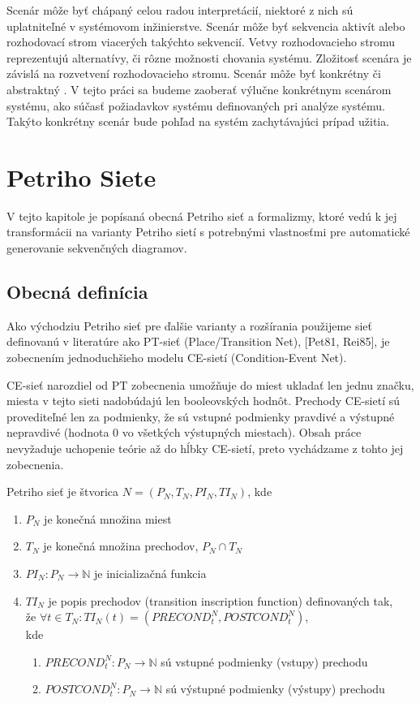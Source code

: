 Scenár môže byť chápaný celou radou interpretácií, niektoré z nich sú uplatniteľné v systémovom inžinierstve. Scenár môže byť sekvencia aktivít alebo rozhodovací strom viacerých takýchto sekvencií. Vetvy rozhodovacieho stromu reprezentujú alternatívy, či rôzne možnosti chovania systému. Zložitosť scenára je závislá na rozvetvení rozhodovacieho stromu. Scenár môže byť konkrétny či abstraktný \cite{scenarios}. V tejto práci sa budeme zaoberať výlučne konkrétnym scenárom systému, ako súčasť požiadavkov systému definovaných pri analýze systému. Takýto konkrétny scenár bude pohľad na systém zachytávajúci prípad užitia.


\chapter{Petriho Siete}
V tejto kapitole je popísaná obecná Petriho sieť a formalizmy, ktoré vedú k jej transformácii na varianty Petriho sietí s potrebnými vlastnosťmi pre automatické generovanie sekvenčných diagramov.

\section{Obecná definícia}
Ako východziu Petriho sieť pre ďalšie varianty a rozšírania použijeme sieť definovanú v literatúre ako PT-sieť (Place/Transition Net), [Pet81, Rei85], je zobecnením jednoduchšieho modelu CE-sietí (Condition-Event Net).

\begin{note}
	CE-sieť narozdiel od PT zobecnenia umožňuje do miest ukladať len jednu značku, miesta v tejto sieti nadobúdajú len booleovských hodnôt. Prechody CE-sietí sú provediteľné len za podmienky, že sú vstupné podmienky pravdivé a výstupné nepravdivé (hodnota 0 vo všetkých výstupných miestach). Obsah práce nevyžaduje uchopenie teórie až do hĺbky CE-sietí, preto vychádzame z tohto jej zobecnenia. 
\end{note}

\begin{defn} Petriho sieť je štvorica $N = (P_N, T_N, PI_N, TI_N)$, kde \begin{enumerate}
	\item $P_N$ je konečná množina miest
	\item $T_N$ je konečná množina prechodov, $P_N \cap T_N$
	\item $PI_N : P_N \longrightarrow  \mathbb{N}$ je inicializačná funkcia
	\item $TI_N$ je popis prechodov (transition inscription function) definovaných tak,\\
	\quad že $\forall t \in T_N : TI_N(t) = (PRECOND_t^N, POSTCOND_t^N)$,\\
	kde
	\begin{enumerate}
		\item $PRECOND_t^N : P_N \longrightarrow \mathbb{N}$ sú vstupné podmienky (vstupy) prechodu
		\item $POSTCOND_t^N : P_N \longrightarrow \mathbb{N}$ sú výstupné podmienky (výstupy) prechodu
	\end{enumerate}
\end{enumerate} \end{defn}

